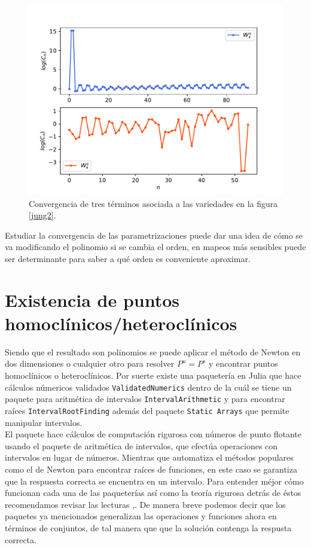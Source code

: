 \begin{figure}[H]
\centering
\includegraphics[scale=0.5]{convergenciaJungT57}
\caption{Convergencia de tres términos asociada a las variedades en la figura \ref{jung2}.}
\label{convergenciaJ3}
\end{figure}

Estudiar la convergencia de las parametrizaciones puede dar una idea de cómo se va modificando el polinomio si se cambia el orden, en mapeos más sensibles puede ser determinante para saber a qué orden es conveniente aproximar. 

\section{Existencia de puntos homoclínicos/heteroclínicos}

Siendo que el resultado son polinomios se puede aplicar el método de Newton en dos dimensiones o cualquier otro para resolver $P^{u}=P^{s}$ y encontrar puntos homoclínicos o heteroclínicos. Por suerte existe una paquetería en Julia que hace cálculos númericos validados \texttt{ValidatedNumerics}\cite{validated} dentro de la cuál se tiene un paquete para aritmética de intervalos \texttt{IntervalArithmetic}\citep{interval} y para encontrar raíces \texttt{IntervalRootFinding}\cite{root} además del paquete \texttt{Static Arrays}\cite{static} que permite manipular intervalos.\\ 

El paquete \cite{validated} hace cálculos de computación rigurosa con números de punto flotante usando el paquete de aritmética de intervalos, que efectúa operaciones con intervalos en lugar de números. Mientras que \cite{root} automatiza el métodos populares como el de Newton para encontrar raíces de funciones, en este caso se garantiza que la respuesta correcta se encuentra en un intervalo. Para entender méjor cómo funcionan cada una de las paqueterías así como la teoría rigurosa detrás de éstos recomendamos revisar las lecturas \cite{ramon},\cite{Numerics}. De manera breve podemos decir que los paquetes ya mencionados generalizan las operaciones y funciones ahora en términos de conjuntos, de tal manera que que la solución contenga la respusta correcta. \\

